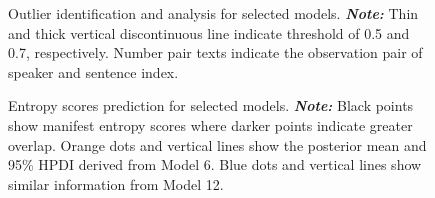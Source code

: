 \documentclass[
  authoryear,
  preprint,
  1p]{elsarticle}
\begin{document}
\label{cell-fig-rq1-model-outliers}
\begin{figure}[H]


\caption{\label{fig-rq1-model-outliers}Outlier identification and
analysis for selected models. \textbf{\emph{Note:}} Thin and thick
vertical discontinuous line indicate threshold of 0.5 and 0.7,
respectively. Number pair texts indicate the observation pair of speaker
and sentence index.}

\end{figure}%

\label{cell-fig-rq3-pred-speaker}
\begin{figure}[H]


\caption{\label{fig-rq3-pred-speaker}Entropy scores prediction for
selected models. \textbf{\emph{Note:}} Black points show manifest
entropy scores where darker points indicate greater overlap. Orange dots
and vertical lines show the posterior mean and 95\% HPDI derived from
Model 6. Blue dots and vertical lines show similar information from
Model 12.}

\end{figure}%
\end{document}
